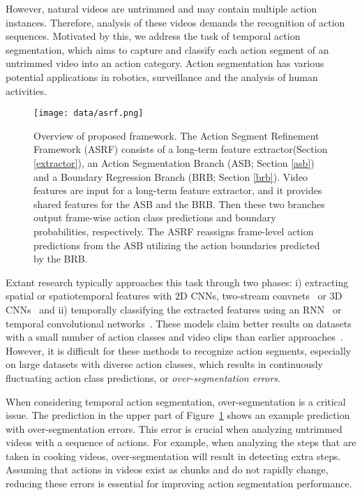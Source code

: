 \documentclass[10pt,twocolumn,letterpaper]{article}
\begin{document}
However, natural videos are untrimmed and may contain multiple action instances.
Therefore, analysis of these videos demands the recognition of action sequences.
Motivated by this, we address the task of temporal action segmentation, which aims to capture and classify each action segment of an untrimmed video into an action category.
Action segmentation has various potential applications in robotics, surveillance and the analysis of human activities.


\begin{figure}[t!]
\begin{center}
\texttt{[image: data/asrf.png]}
\end{center}
\caption{
Overview of proposed framework. The Action Segment Refinement Framework (ASRF) consists of a long-term feature extractor(Section \ref{extractor}), an Action Segmentation Branch (ASB; Section \ref{asb}) and a Boundary Regression Branch (BRB; Section \ref{brb}). 
Video features are input for a long-term feature extractor, and it provides shared features for the ASB and the BRB.
Then these two branches output frame-wise action class predictions and boundary probabilities, respectively.
The ASRF reassigns frame-level action predictions from the ASB utilizing the action boundaries predicted by the BRB.
}
\label{fig:network}
\vspace{-5pt}
\end{figure}

Extant research typically approaches this task through two phases: i) extracting spatial or spatiotemporal features with 2D CNNs, two-stream convnets~\cite{SimonyanNIPS2014,FeichtenhoferCVPR2016} or 3D CNNs~\cite{CarreiraCVPR2017} and
ii) temporally classifying the extracted features using an RNN~\cite{bi-lstm} or temporal convolutional networks~\cite{tcn,deform,mstcn}.
These models claim better results on datasets with a small number of action classes and video clips than earlier approaches~\cite{slidingwindow1,slidingwindow2}.
However, it is difficult for these methods to recognize action segments, especially on large datasets with diverse action classes, which results in continuously fluctuating action class predictions, or \textit{over-segmentation errors}.

When considering temporal action segmentation, over-segmentation is a critical issue.
The prediction in the upper part of Figure~\ref{fig:network} shows an example prediction with over-segmentation errors.
This error is crucial when analyzing untrimmed videos with a sequence of actions.
For example, when analyzing the steps that are taken in cooking videos, over-segmentation will result in detecting extra steps.
Assuming that actions in videos exist as chunks and do not rapidly change, reducing these errors is essential for improving action segmentation performance.
\end{document}
